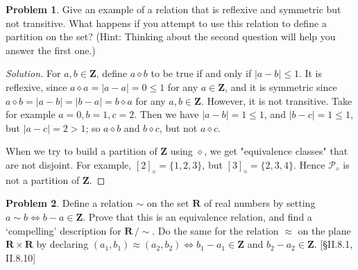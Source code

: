 \documentclass[fontsize=14pt]{scrartcl}
\theoremstyle{definition}
\newtheorem{problem-internal}{Problem}[subsection]
\newenvironment{problem}{
  \medskip
  \begin{problem-internal}
}{
  \end{problem-internal}
}
\newenvironment{solution}{
  \begin{proof}[Solution]
  \vspace{-8px}
  \setlength{\parskip}{4px}
  \setlength{\parindent}{0px}
}{
  \end{proof}
}
\newcommand{\abs}[1]{\left|#1\right|}
\begin{document}
\begin{problem}
Give an example of a relation that is reflexive and symmetric but not
transitive. What happens if you attempt to use this relation to define a
partition on the set? (Hint: Thinking about the second question will help you
answer the first one.)
\end{problem}

\begin{solution}
For $a,b\in \mathbf{Z}$, define $a\diamond b$ to be true if and only if
$\abs{a-b} \leq 1$. It is reflexive, since $a\diamond a = \abs{a-a} = 0 \leq 1$
for any $a\in \mathbf{Z}$, and it is symmetric since $a\diamond b = \abs{a-b} =
\abs{b-a} = b\diamond a$ for any $a,b\in \mathbf{Z}$. However, it is not
transitive. Take for example $a=0, b=1, c=2$.  Then we have $\abs{a-b} = 1\leq
1$, and $\abs{b-c} = 1\leq 1$, but $\abs{a-c} = 2 > 1$; so $a\diamond b$ and
$b\diamond c$, but not $a\diamond c$.

When we try to build a partition of $\mathbf{Z}$ using $\diamond$, we get
"equivalence classes" that are not disjoint. For example, $[2]_{\diamond} =
\{1,2,3\}$, but $[3]_{\diamond} = \{2,3,4\}$. Hence $\mathscr{P}_{\diamond}$ is
not a partition of $\mathbf{Z}$.
\end{solution}


\begin{problem}
Define a relation $\sim$ on the set $\mathbf{R}$ of real numbers by
setting $a\sim b\iff b-a\in\mathbf{Z}$. Prove that this is an equivalence
relation, and find a `compelling' description for $\mathbf{R}\,/\!\sim$. Do the
same for the relation $\approx$ on the plane $\mathbf{R}\times\mathbf{R}$ by
declaring $(a_1,b_1)\approx(a_2,b_2)\iff b_1-a_1\in\mathbf{Z}$ and
$b_2-a_2\in\mathbf{Z}$. [\S II.8.1, II.8.10]
\end{problem}
\end{document}
